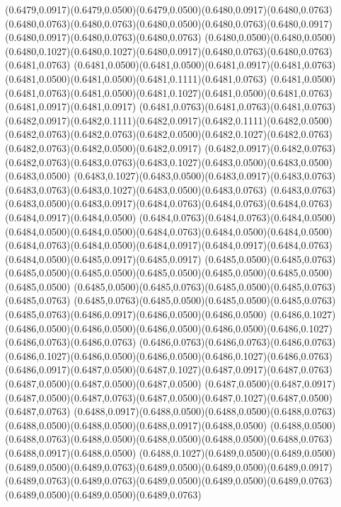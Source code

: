 (0.6479,0.0917)(0.6479,0.0500)(0.6479,0.0500)(0.6480,0.0917)(0.6480,0.0763)
\PST@Solid(0.6480,0.0763)(0.6480,0.0763)(0.6480,0.0500)(0.6480,0.0763)(0.6480,0.0917)(0.6480,0.0917)(0.6480,0.0763)(0.6480,0.0763)
(0.6480,0.0500)(0.6480,0.0500)(0.6480,0.1027)(0.6480,0.1027)(0.6480,0.0917)(0.6480,0.0763)(0.6480,0.0763)(0.6481,0.0763)
(0.6481,0.0500)(0.6481,0.0500)(0.6481,0.0917)(0.6481,0.0763)(0.6481,0.0500)(0.6481,0.0500)(0.6481,0.1111)(0.6481,0.0763)
(0.6481,0.0500)(0.6481,0.0763)(0.6481,0.0500)(0.6481,0.1027)(0.6481,0.0500)(0.6481,0.0763)(0.6481,0.0917)(0.6481,0.0917)
(0.6481,0.0763)(0.6481,0.0763)(0.6481,0.0763)(0.6482,0.0917)(0.6482,0.1111)(0.6482,0.0917)(0.6482,0.1111)(0.6482,0.0500)
(0.6482,0.0763)(0.6482,0.0763)(0.6482,0.0500)(0.6482,0.1027)(0.6482,0.0763)(0.6482,0.0763)(0.6482,0.0500)(0.6482,0.0917)
(0.6482,0.0917)(0.6482,0.0763)(0.6482,0.0763)(0.6483,0.0763)(0.6483,0.1027)(0.6483,0.0500)(0.6483,0.0500)(0.6483,0.0500)
(0.6483,0.1027)(0.6483,0.0500)(0.6483,0.0917)(0.6483,0.0763)(0.6483,0.0763)(0.6483,0.1027)(0.6483,0.0500)(0.6483,0.0763)
(0.6483,0.0763)(0.6483,0.0500)(0.6483,0.0917)(0.6484,0.0763)(0.6484,0.0763)(0.6484,0.0763)(0.6484,0.0917)(0.6484,0.0500)
(0.6484,0.0763)(0.6484,0.0763)(0.6484,0.0500)(0.6484,0.0500)(0.6484,0.0500)(0.6484,0.0763)(0.6484,0.0500)(0.6484,0.0500)
(0.6484,0.0763)(0.6484,0.0500)(0.6484,0.0917)(0.6484,0.0917)(0.6484,0.0763)(0.6484,0.0500)(0.6485,0.0917)(0.6485,0.0917)
(0.6485,0.0500)(0.6485,0.0763)(0.6485,0.0500)(0.6485,0.0500)(0.6485,0.0500)(0.6485,0.0500)(0.6485,0.0500)(0.6485,0.0500)
(0.6485,0.0500)(0.6485,0.0763)(0.6485,0.0500)(0.6485,0.0763)(0.6485,0.0763)
\PST@Solid(0.6485,0.0763)(0.6485,0.0500)(0.6485,0.0500)(0.6485,0.0763)(0.6485,0.0763)(0.6486,0.0917)(0.6486,0.0500)(0.6486,0.0500)
(0.6486,0.1027)(0.6486,0.0500)(0.6486,0.0500)(0.6486,0.0500)(0.6486,0.0500)(0.6486,0.1027)(0.6486,0.0763)(0.6486,0.0763)
(0.6486,0.0763)(0.6486,0.0763)(0.6486,0.0763)(0.6486,0.1027)(0.6486,0.0500)(0.6486,0.0500)(0.6486,0.1027)(0.6486,0.0763)
(0.6486,0.0917)(0.6487,0.0500)(0.6487,0.1027)(0.6487,0.0917)(0.6487,0.0763)(0.6487,0.0500)(0.6487,0.0500)(0.6487,0.0500)
(0.6487,0.0500)(0.6487,0.0917)(0.6487,0.0500)(0.6487,0.0763)(0.6487,0.0500)(0.6487,0.1027)(0.6487,0.0500)(0.6487,0.0763)
(0.6488,0.0917)(0.6488,0.0500)(0.6488,0.0500)(0.6488,0.0763)(0.6488,0.0500)(0.6488,0.0500)(0.6488,0.0917)(0.6488,0.0500)
(0.6488,0.0500)(0.6488,0.0763)(0.6488,0.0500)(0.6488,0.0500)(0.6488,0.0500)(0.6488,0.0763)(0.6488,0.0917)(0.6488,0.0500)
(0.6488,0.1027)(0.6489,0.0500)(0.6489,0.0500)(0.6489,0.0500)(0.6489,0.0763)(0.6489,0.0500)(0.6489,0.0500)(0.6489,0.0917)
(0.6489,0.0763)(0.6489,0.0763)(0.6489,0.0500)(0.6489,0.0500)(0.6489,0.0763)(0.6489,0.0500)(0.6489,0.0500)(0.6489,0.0763)
